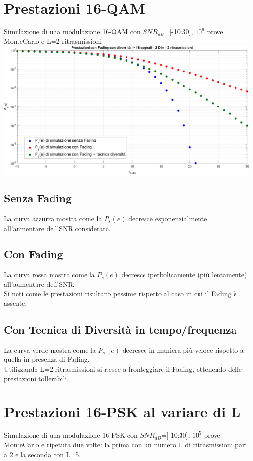 \documentclass[12pt, a4paper]{article}
\begin{document}
	
	
	\newpage
	\section{Prestazioni 16-QAM}
	Simulazione di una modulazione 16-QAM con \(SNR_{dB}\)=[-10:30], \(10^6\) prove MonteCarlo e L=2 ritrasmissioni\vspace{.1cm}\\
	\includegraphics[width=\linewidth]{images/QAM MC 1e6.png}
	\subsection{Senza Fading}
	La curva azzurra mostra come la \(P_s(e)\) decresce \underline{esponenzialmente} all’aumentare dell’SNR considerato.
	\subsection{Con Fading}
	La curva rossa mostra come la \(P_s(e)\) decresce \underline{iperbolicamente} (più lentamente) all’aumentare dell’SNR.\\
	Si noti come le prestazioni risultano pessime rispetto al caso in cui il Fading è assente.
	\subsection{Con Tecnica di Diversità in tempo/frequenza}
	La curva verde mostra come la \(P_s(e)\) decresce in maniera più veloce rispetto a quella in presenza di Fading.\\
	Utilizzando L=2 ritrasmissioni si riesce a fronteggiare il Fading, ottenendo delle prestazioni tollerabili.
	
	
	\newpage
	\section{Prestazioni 16-PSK al variare di L}
	Simulazione di una modulazione 16-PSK con \(SNR_{dB}\)=[-10:30], \(10^5\) prove MonteCarlo e ripetuta due volte: la prima con un numero L di ritrasmissioni pari a 2 e la seconda con L=5.
\end{document}
